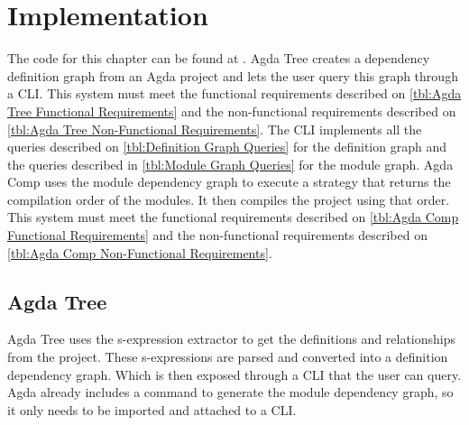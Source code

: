 
\chapter{Implementation} \label{ch:implementation}

The code for this chapter can be found at \cite{agda_html}. Agda Tree creates a
dependency definition graph from an Agda project and lets the user query this
graph through a CLI. This system must meet the functional requirements
described on \cref{tbl:Agda Tree Functional Requirements} and the
non-functional requirements described on \cref{tbl:Agda Tree Non-Functional
Requirements}. The CLI implements all the queries described on
\cref{tbl:Definition Graph Queries} for the definition graph and the queries
described in \cref{tbl:Module Graph Queries} for the module graph. Agda Comp
uses the module dependency graph to execute a strategy that returns the
compilation order of the modules. It then compiles the project using that
order. This system must meet the functional requirements described on
\ref{tbl:Agda Comp Functional Requirements} and the non-functional requirements
described on \ref{tbl:Agda Comp Non-Functional Requirements}.





\section{Agda Tree}

Agda Tree \cite{agda_html} uses the s-expression extractor \cite{andrej} to get the definitions
and relationships from the project. These s-expressions are parsed and
converted into a definition dependency graph. Which is then exposed through a
CLI that the user can query. Agda already includes a command to generate the
module dependency graph, so it only needs to be imported and attached to a CLI.

